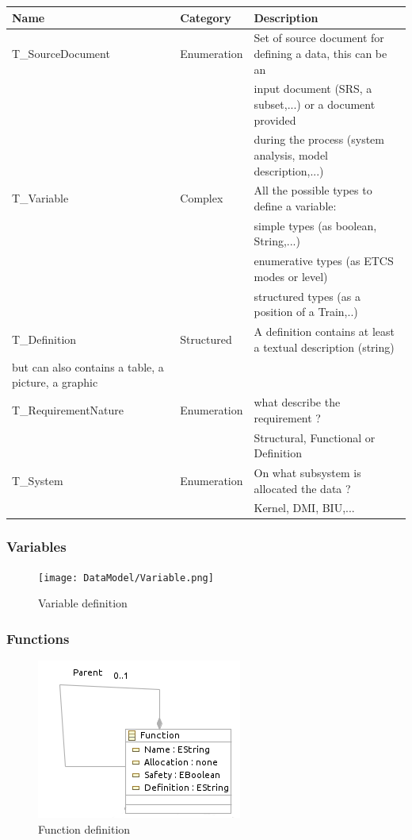 \begin{tabular}{|l | l | l | }
\hline
Name & Category & Description \\
\hline
T\_SourceDocument & Enumeration & Set of source document for defining a data, this can be an \\
& & input document (SRS, a subset,...) or a document provided \\
& & during the process (system analysis, model description,...) \\
\hline
T\_Variable & Complex & All the possible types to define a variable: \\
& & simple types (as boolean, String,...)  \\
& & enumerative types (as ETCS modes or level) \\
& & structured types (as a position of a Train,..) \\
\hline
T\_Definition & Structured & A definition contains at least a textual description (string)  \\
but can also contains a table, a picture, a graphic \\
\hline
T\_RequirementNature & Enumeration & what describe the requirement ? \\
& & Structural, Functional or Definition\\
\hline
T\_System & Enumeration & On what subsystem is allocated the data ? \\
& & Kernel, DMI, BIU,...\\
\hline
\end{tabular}


\subsubsection{Variables}


\begin{figure}[ht]
  \centering
  \texttt{[image: DataModel/Variable.png]}
  \caption{Variable definition}
  \label{fig:variable}
\end{figure}

\subsubsection{Functions}


\begin{figure}[ht]
  \centering
  \includegraphics{DataModel/Function.png}
  \caption{Function definition}
  \label{fig:function}
\end{figure}

